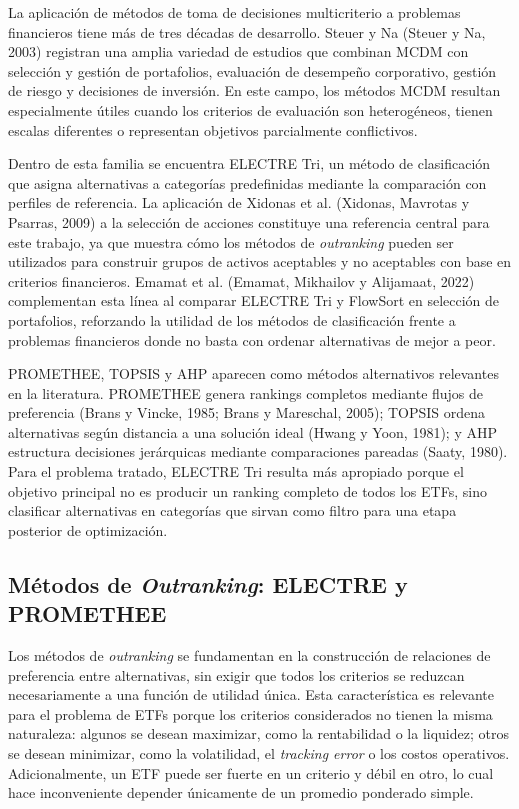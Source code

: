 \documentclass[12pt,letterpaper]{article}
\begin{document}
La aplicación de métodos de toma de decisiones multicriterio a problemas financieros tiene más de tres décadas de desarrollo. Steuer y Na (Steuer y Na, 2003) registran una amplia variedad de estudios que combinan MCDM con selección y gestión de portafolios, evaluación de desempeño corporativo, gestión de riesgo y decisiones de inversión. En este campo, los métodos MCDM resultan especialmente útiles cuando los criterios de evaluación son heterogéneos, tienen escalas diferentes o representan objetivos parcialmente conflictivos.

Dentro de esta familia se encuentra ELECTRE Tri, un método de clasificación que asigna alternativas a categorías predefinidas mediante la comparación con perfiles de referencia. La aplicación de Xidonas et al. (Xidonas, Mavrotas y Psarras, 2009) a la selección de acciones constituye una referencia central para este trabajo, ya que muestra cómo los métodos de \textit{outranking} pueden ser utilizados para construir grupos de activos aceptables y no aceptables con base en criterios financieros. Emamat et al. (Emamat, Mikhailov y Alijamaat, 2022) complementan esta línea al comparar ELECTRE Tri y FlowSort en selección de portafolios, reforzando la utilidad de los métodos de clasificación frente a problemas financieros donde no basta con ordenar alternativas de mejor a peor.

PROMETHEE, TOPSIS y AHP aparecen como métodos alternativos relevantes en la literatura. PROMETHEE genera rankings completos mediante flujos de preferencia (Brans y Vincke, 1985; Brans y Mareschal, 2005); TOPSIS ordena alternativas según distancia a una solución ideal (Hwang y Yoon, 1981); y AHP estructura decisiones jerárquicas mediante comparaciones pareadas (Saaty, 1980). Para el problema tratado, ELECTRE Tri resulta más apropiado porque el objetivo principal no es producir un ranking completo de todos los ETFs, sino clasificar alternativas en categorías que sirvan como filtro para una etapa posterior de optimización.



\subsection{Métodos de \textit{Outranking}: ELECTRE y PROMETHEE}

Los métodos de \textit{outranking} se fundamentan en la construcción de relaciones de preferencia entre alternativas, sin exigir que todos los criterios se reduzcan necesariamente a una función de utilidad única. Esta característica es relevante para el problema de ETFs porque los criterios considerados no tienen la misma naturaleza: algunos se desean maximizar, como la rentabilidad o la liquidez; otros se desean minimizar, como la volatilidad, el \textit{tracking error} o los costos operativos. Adicionalmente, un ETF puede ser fuerte en un criterio y débil en otro, lo cual hace inconveniente depender únicamente de un promedio ponderado simple.
\end{document}
